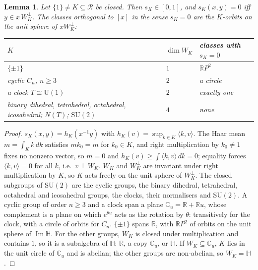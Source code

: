 \documentclass[aps,pra,onecolumn,superscriptaddress,nofootinbib,10pt]{revtex4-2}
\newtheorem{lemma}[theorem]{Lemma}
\theoremstyle{definition}
\theoremstyle{remark}
\newcommand{\R}{\mathbb{R}}
\newcommand{\C}{\mathbb{C}}
\newcommand{\HH}{\mathbb{H}}
\newcommand{\cR}{\mathcal{R}}
\newcommand{\im}{\operatorname{Im}}
\newcommand{\ip}[2]{\langle #1,#2\rangle}
\newcommand{\SU}{\mathrm{SU}}
\newcommand{\U}{\mathrm{U}}
\begin{document}
\begin{lemma}\label{lem:classes}
Let $\{1\}\ne K\subseteq\cR$ be closed.  Then $s_K\in[0,1]$, and $s_K(x,y)=0$ iff $y\in x\,W_K^\perp$.  The classes
orthogonal to $[x]$ in the sense $s_K=0$ are the $K$-orbits on the unit sphere of $xW_K^\perp$:
\begin{center}\footnotesize
\begin{tabular}{@{}lll@{}}
\toprule
$K$ & $\dim W_K$ & classes with $s_K=0$\\
\midrule
$\{\pm1\}$ & $1$ & $\R P^2$ \\
cyclic $C_n$, $n\ge3$ & $2$ & a circle \\
a clock $T\cong\U(1)$ & $2$ & exactly one \\
binary dihedral, tetrahedral, octahedral, icosahedral; $N(T)$; $\SU(2)$ & $4$ & none \\
\bottomrule
\end{tabular}
\end{center}
\end{lemma}
\begin{proof}
$s_K(x,y)=h_K(x^{-1}y)$ with $h_K(v)=\sup_{k\in K}\ip kv$.  The Haar mean $m=\int_Kk\,dk$ satisfies $mk_0=m$ for
$k_0\in K$, and right multiplication by $k_0\ne1$ fixes no nonzero vector, so $m=0$ and
$h_K(v)\ge\int\ip kv\,dk=0$; equality forces $\ip kv=0$ for all $k$, i.e.\ $v\perp W_K$.  $W_K$ and $W_K^\perp$ are
invariant under right multiplication by $K$, so $K$ acts freely on the unit sphere of $W_K^\perp$.  The
closed subgroups of $\SU(2)$ are the cyclic groups, the binary dihedral, tetrahedral, octahedral and
icosahedral groups, the clocks, their normalisers and $\SU(2)$.  A cyclic group of order $n\ge3$ and a clock
span a plane $\C_u=\R+\R u$, whose complement is a plane on which $e^{\theta u}$ acts as the rotation by
$\theta$: transitively for the clock, with a circle of orbits for $C_n$.  $\{\pm1\}$ spans $\R$, with $\R P^2$
of orbits on the unit sphere of $\im\HH$.  For the other groups, $W_K$ is closed under multiplication and
contains $1$, so it is a subalgebra of $\HH$: $\R$, a copy $\C_u$, or $\HH$.  If $W_K\subseteq\C_u$, $K$ lies in the unit
circle of $\C_u$ and is abelian; the other groups are non-abelian, so $W_K=\HH$.
\end{proof}
\end{document}
